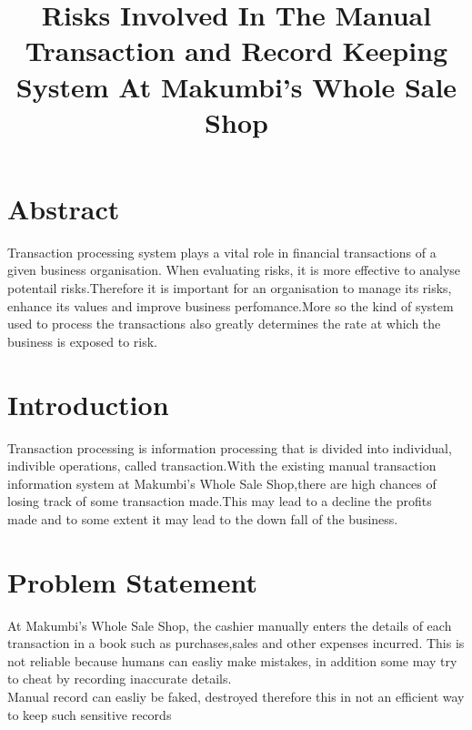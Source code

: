 \documentclass[12pt]{article}
\title{Risks Involved In The Manual Transaction and Record Keeping System At Makumbi's Whole Sale Shop}
\begin{document}
\maketitle
\section{Abstract}
Transaction processing system plays a vital role in financial transactions of a given business organisation. When evaluating risks, it is more effective to analyse potentail risks.Therefore it is important for an organisation to manage its risks, enhance its values and improve business perfomance.More so the kind of system used to process the transactions also greatly determines the rate at which the business is exposed to risk. 
\section{Introduction}
Transaction processing is information processing that is divided into individual, indivible operations, called transaction.With the existing manual transaction information system at Makumbi's Whole Sale Shop,there are high chances of losing track of some transaction made.This may lead to a decline the profits made and to some extent it may lead to the down fall of the business. \\
\section{Problem Statement}
At Makumbi's Whole Sale Shop, the cashier manually enters the details of each transaction in a book such as purchases,sales and other expenses incurred. This is not reliable because humans can easliy make mistakes, in addition some may try to cheat by recording inaccurate details.\\
Manual record can easliy be faked, destroyed therefore this in not an efficient way to keep such sensitive records
\end{document}
